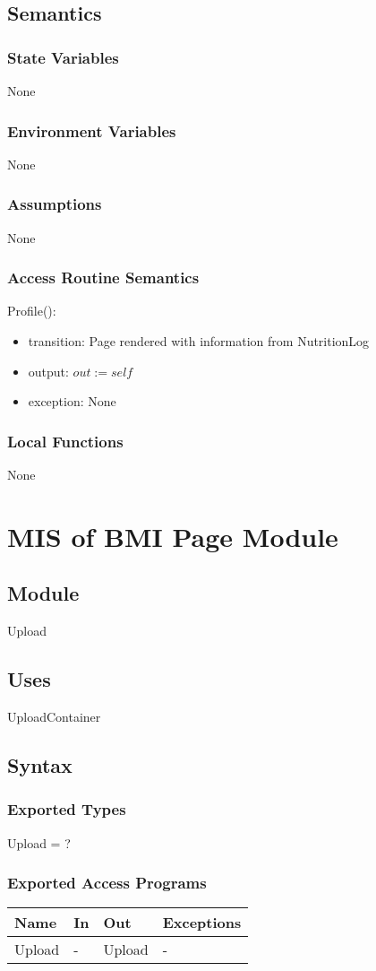 \documentclass[12pt, titlepage]{article}
\begin{document}
\subsection{Semantics}
\subsubsection{State Variables}
None
\subsubsection{Environment Variables}
None
\subsubsection{Assumptions}
None
\subsubsection{Access Routine Semantics}
\noindent Profile():
\begin{itemize}
	\item transition: Page rendered with information from NutritionLog
	\item output: $out := self$
	\item exception: None
\end{itemize}
\subsubsection{Local Functions}
None

\newpage

\section{MIS of BMI Page Module}
\subsection{Module}
Upload
\subsection{Uses}
UploadContainer
\subsection{Syntax}
\subsubsection{Exported Types}
Upload = ?
\subsubsection{Exported Access Programs}
\begin{center}
	\begin{tabular}{p{2cm} p{4cm} p{4cm} p{2cm}}
		\hline
		\textbf{Name} & \textbf{In} & \textbf{Out} & \textbf{Exceptions} \\
		\hline
		Upload & - & Upload & - \\
		\hline
	\end{tabular}
\end{center}
\end{document}
